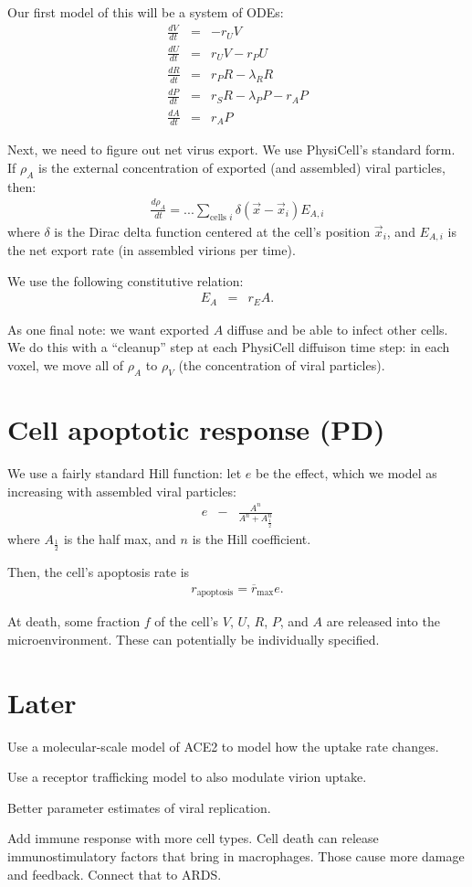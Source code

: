 \documentclass[12point]{article}
\begin{document}
Our first model of this will be a system of ODEs: 
\begin{eqnarray}
\frac{dV}{dt} & = & -r_U V \\
\frac{dU}{dt} & = & r_U V - r_P U \\
\frac{dR}{dt} & = & r_P R - \lambda_R R \\
\frac{dP}{dt} & = & r_S R - \lambda_P P - r_A P \\
\frac{dA}{dt} & = & r_A P
\end{eqnarray}

Next, we need to figure out net virus export. We use PhysiCell's standard form. If $\rho_A$ is the external concentration of exported (and assembled) viral particles, then: 
\begin{eqnarray}
\frac{d\rho_A}{dt} = ... \sum_{\textrm{cells } i} \delta( \vec{x}-\vec{x}_i ) E_{A,i}
\end{eqnarray}
where $\delta$ is the Dirac delta function centered at the cell's position
$\vec{x}_i$, and $E_{A,i}$ is the net export rate (in assembled virions per time). 

We use the following constitutive relation: 
\begin{eqnarray}
E_A & = & r_E A. 
\end{eqnarray}

As one final note: we want exported $A$ diffuse and be able to infect other cells. We do this with a ``cleanup'' step at each PhysiCell diffuison time step: in each voxel, we move all of $\rho_A$ to $\rho_V$ (the concentration 
of viral particles). 

\section{Cell apoptotic response (PD)}
We use a fairly standard Hill function: let $e$ be the effect, which we model as increasing with assembled viral particles: 
\begin{eqnarray}
e & - & \frac{ A^n  }{ A^n + A_{\frac{1}{2}}^n  }
\end{eqnarray}
where $A_{\frac{1}{2}}$ is the half max, and $n$ is the Hill coefficient. 

Then, the cell's apoptosis rate is 
\begin{eqnarray}
r_{\textrm{apoptosis}} = \overline{r}_\textrm{max} e. 
\end{eqnarray}

At death, some fraction $f$ of the cell's $V$, $U$, $R$, $P$, and $A$ are released into the microenvironment. These can potentially be individually specified. 

\section{Later}
Use a molecular-scale model of ACE2 to model how the uptake rate changes. 

Use a receptor trafficking model to also modulate virion uptake. 

Better parameter estimates of viral replication.

Add immune response with more cell types. Cell death can release immunostimulatory factors that bring in macrophages. Those cause more damage and feedback. Connect that to ARDS. 
\end{document}
